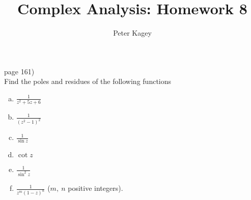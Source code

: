 \documentclass{article}
\newenvironment{problem}[2][Problem]{\begin{trivlist}
\item[\hskip \labelsep {\bfseries #1}\hskip \labelsep {\bfseries #2.}]}{\end{trivlist}}
\begin{document}
\title{Complex Analysis: Homework 8}
\author{Peter Kagey}

\maketitle

\begin{problem}{1} (page 161) \\
  Find the poles and residues of the following functions \begin{enumerate}[(a)]
    \item $\displaystyle \frac{1}{z^2 + 5z + 6}$
    \item $\displaystyle \frac{1}{(z^2 - 1)^2}$
    \item $\displaystyle \frac{1}{\sin z}$
    \item $\displaystyle \cot z$
    \item $\displaystyle \frac{1}{\sin^2 z}$
    \item $\displaystyle \frac{1}{z^m(1-z)^n}$ ($m,\ n$ positive integers).
  \end{enumerate}
\end{problem}
\end{document}

